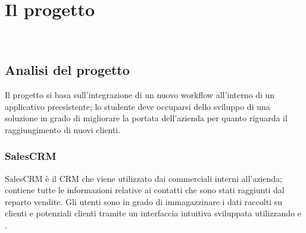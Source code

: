 \chapter{Il progetto}
\label{cap:descrizione-stage}

\\

\section{Analisi del progetto}

Il progetto si basa sull'integrazione di un nuovo workflow all'interno di un applicativo preesistente; lo studente deve occuparsi dello sviluppo di una soluzione in grado di migliorare la portata dell'azienda per quanto riguarda il raggiungimento di nuovi clienti.

\subsection{SalesCRM}
SalesCRM è il CRM che viene utilizzato dai commerciali interni all'azienda; contiene tutte le informazioni relative ai contatti che sono stati raggiunti dal reparto vendite. 
Gli utenti sono in grado di immagazzinare i dati raccolti su clienti e potenziali clienti tramite un interfaccia intuitiva sviluppata utilizzando  e .

